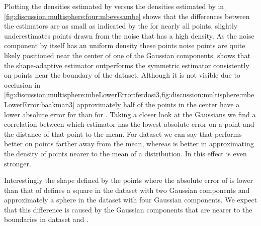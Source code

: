 	Plotting the densities estimated by \sambe versus the densities estimated by \mbe in \cref{fig:discussion:multisphere:four:mbevssambe} shows that the differences between the estimators are as small as indicated by the \mse for nearly all points, \sambe slightly underestimates points drawn from the noise that has a high density. As the noise component by itself has an uniform density these points noise points are quite likely positioned near the center of one of the Gaussian components.  shows that the shape-adaptive estimator outperforms the symmetric estimator consistently on points near the boundary of the dataset. Although it is not visible due to occlusion in \cref{fig:discussion:multisphere:mbeLowerError:ferdosi3,fig:discussion:multisphere:mbeLowerError:baakman3} approximately half of the points in the center have a lower absolute error for \sambe than for \mbe. Taking a closer look at the Gaussians we find a correlation between which estimator has the lowest absolute error on a point and the distance of that point to the mean. For dataset \ferdosiThree we can say that \sambe performs better on points farther away from the mean, whereas \mbe is better in approximating the density of points nearer to the mean of a distribution. In \baakmanThree this effect is even stronger. 

	Interestingly the shape defined by the points where the absolute error of \mbe is lower than that of \sambe defines a square in the dataset with two Gaussian components and approximately a sphere in the dataset with four Gaussian components. We expect that this difference is caused by the Gaussian components that are nearer to the boundaries in dataset \ferdosiThree and \baakmanThree. 

